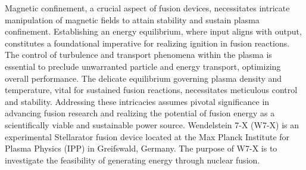 \normalsize{\indent Magnetic confinement, a crucial aspect of fusion devices, necessitates intricate manipulation of magnetic fields to attain stability and sustain plasma confinement. Establishing an energy equilibrium, where input aligns with output, constitutes a foundational imperative for realizing ignition in fusion reactions. The control of turbulence and transport phenomena within the plasma is essential to preclude unwarranted particle and energy transport, optimizing overall performance. The delicate equilibrium governing plasma density and temperature, vital for sustained fusion reactions, necessitates meticulous control and stability. Addressing these intricacies assumes pivotal significance in advancing fusion research and realizing the potential of fusion energy as a scientifically viable and sustainable power source. Wendelstein 7-X (\acrshort{W7-X}) is an experimental Stellarator fusion device located at the Max Planck Institute for Plasma Physics (IPP) in Greifswald, Germany. The purpose of \acrshort{W7-X} is to investigate the feasibility of generating energy through nuclear fusion.}

